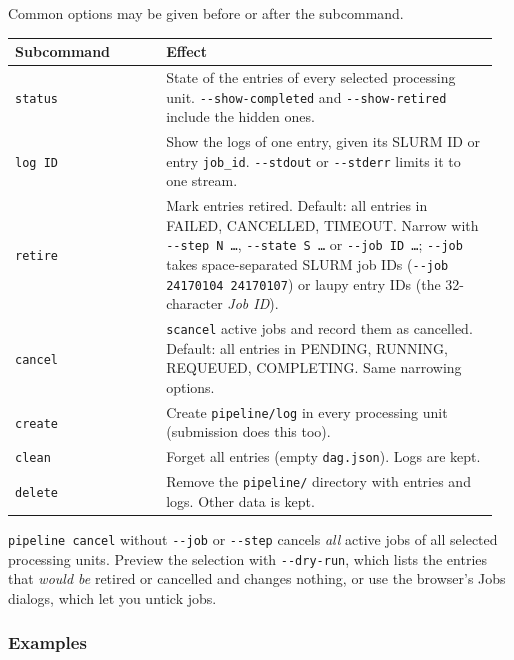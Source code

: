\documentclass[11pt,a4paper]{article}
\newcommand{\cmd}[1]{\texttt{#1}}
\newcommand{\menu}[1]{\textsf{#1}}
\begin{document}
Common options may be given before or after the subcommand.

\begin{longtable}{@{}>{\raggedright}p{0.3\linewidth}>{\raggedright\arraybackslash}p{0.66\linewidth}@{}}
\toprule
Subcommand & Effect \\
\midrule
\endhead
\cmd{status} & State of the entries of every selected processing unit. \cmd{-{}-show-completed} and \cmd{-{}-show-retired} include the hidden ones. \\
\cmd{log ID} & Show the logs of one entry, given its SLURM ID or entry \cmd{job\_id}. \cmd{-{}-stdout} or \cmd{-{}-stderr} limits it to one stream. \\
\cmd{retire} & Mark entries retired. Default: all entries in FAILED, CANCELLED, TIMEOUT. Narrow with \cmd{-{}-step N \ldots}, \cmd{-{}-state S \ldots} or \cmd{-{}-job ID \ldots}; \cmd{-{}-job} takes space-separated SLURM job IDs (\cmd{-{}-job 24170104 24170107}) or laupy entry IDs (the 32-character \emph{Job ID}). \\
\cmd{cancel} & \cmd{scancel} active jobs and record them as cancelled. Default: all entries in PENDING, RUNNING, REQUEUED, COMPLETING. Same narrowing options. \\
\cmd{create} & Create \cmd{pipeline/log} in every processing unit (submission does this too). \\
\cmd{clean} & Forget all entries (empty \cmd{dag.json}). Logs are kept. \\
\cmd{delete} & Remove the \cmd{pipeline/} directory with entries and logs. Other data is kept. \\
\bottomrule
\end{longtable}

\begin{warning}
\cmd{pipeline cancel} without \cmd{-{}-job} or \cmd{-{}-step} cancels \emph{all} active jobs of
all selected processing units. Preview the selection with \cmd{-{}-dry-run}, which lists the
entries that \emph{would be} retired or cancelled and changes nothing, or use the browser's
\menu{Jobs} dialogs, which let you untick jobs.
\end{warning}

\subsubsection*{Examples}
\end{document}
